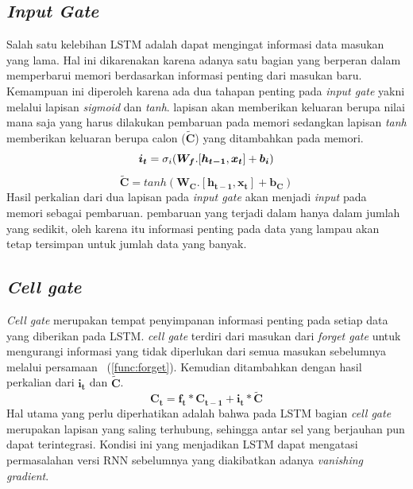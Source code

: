 \subsection{\textit{Input Gate}}
Salah satu kelebihan LSTM adalah dapat mengingat informasi data masukan yang lama. Hal ini dikarenakan karena adanya satu bagian yang berperan dalam memperbarui memori berdasarkan informasi penting dari masukan baru. Kemampuan ini diperoleh karena ada dua tahapan penting pada \textit{input gate} yakni melalui lapisan \textit{sigmoid} dan \textit{tanh}. lapisan akan memberikan keluaran berupa nilai mana saja yang harus dilakukan pembaruan pada memori sedangkan lapisan \textit{tanh} memberikan keluaran berupa calon ($\boldsymbol{\tilde{C}}$) yang ditambahkan pada memori. 
\begin{equation}
	\boldsymbol{i_t} = \sigma_i(\boldsymbol{W_{f}}.[\boldsymbol{h_{t-1}}, \boldsymbol{x_t}] + \boldsymbol{b_i})\\
	\label{func:input}
\end{equation}
\begin{equation}
	\boldsymbol{\tilde{C}} = tanh(\boldsymbol{W_{C}}.[\boldsymbol{h_{t-1}}, \boldsymbol{x_t}] + \boldsymbol{b_C})
	\label{func:C-tilde}
\end{equation}
Hasil perkalian dari dua lapisan pada \textit{input gate} akan menjadi \textit{input} pada memori sebagai pembaruan. pembaruan yang terjadi dalam hanya dalam jumlah yang sedikit, oleh karena itu informasi penting pada data yang lampau akan tetap tersimpan untuk jumlah data yang banyak.
\subsection{\textit{Cell gate}}
\textit{Cell gate} merupakan tempat penyimpanan informasi penting pada setiap data yang diberikan pada LSTM. \textit{cell gate} terdiri dari masukan dari \textit{forget gate} untuk mengurangi informasi yang tidak diperlukan dari semua masukan sebelumnya melalui persamaan ~(\ref{func:forget}). Kemudian ditambahkan dengan hasil perkalian dari $\boldsymbol{i_t}$ dan $\boldsymbol{\tilde{C}}$.
\begin{equation}
	\boldsymbol{C_t} = \boldsymbol{f_t}*\boldsymbol{C_{t-1}} + \boldsymbol{i_t} * \boldsymbol{\tilde{C}}
	\label{func:cell_gate}
\end{equation}
Hal utama yang perlu diperhatikan adalah bahwa pada LSTM bagian \textit{cell gate} merupakan lapisan yang saling terhubung, sehingga antar sel yang berjauhan pun dapat terintegrasi. Kondisi ini yang menjadikan LSTM dapat mengatasi permasalahan versi RNN sebelumnya yang diakibatkan adanya \textit{vanishing gradient}.
